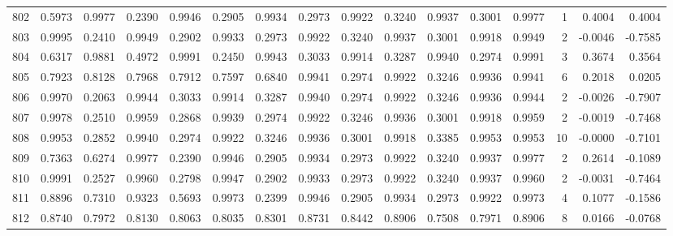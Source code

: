 \begin{tabular}{lrrrrrrrrrrrrrrr}
802 &      0.5973 &  0.9977 &  0.2390 &  0.9946 &  0.2905 &  0.9934 &  0.2973 &  0.9922 &  0.3240 &  0.9937 &   0.3001 &     0.9977 &      1 &                    0.4004 &                     0.4004 \\
803 &      0.9995 &  0.2410 &  0.9949 &  0.2902 &  0.9933 &  0.2973 &  0.9922 &  0.3240 &  0.9937 &  0.3001 &   0.9918 &     0.9949 &      2 &                   -0.0046 &                    -0.7585 \\
804 &      0.6317 &  0.9881 &  0.4972 &  0.9991 &  0.2450 &  0.9943 &  0.3033 &  0.9914 &  0.3287 &  0.9940 &   0.2974 &     0.9991 &      3 &                    0.3674 &                     0.3564 \\
805 &      0.7923 &  0.8128 &  0.7968 &  0.7912 &  0.7597 &  0.6840 &  0.9941 &  0.2974 &  0.9922 &  0.3246 &   0.9936 &     0.9941 &      6 &                    0.2018 &                     0.0205 \\
806 &      0.9970 &  0.2063 &  0.9944 &  0.3033 &  0.9914 &  0.3287 &  0.9940 &  0.2974 &  0.9922 &  0.3246 &   0.9936 &     0.9944 &      2 &                   -0.0026 &                    -0.7907 \\
807 &      0.9978 &  0.2510 &  0.9959 &  0.2868 &  0.9939 &  0.2974 &  0.9922 &  0.3246 &  0.9936 &  0.3001 &   0.9918 &     0.9959 &      2 &                   -0.0019 &                    -0.7468 \\
808 &      0.9953 &  0.2852 &  0.9940 &  0.2974 &  0.9922 &  0.3246 &  0.9936 &  0.3001 &  0.9918 &  0.3385 &   0.9953 &     0.9953 &     10 &                   -0.0000 &                    -0.7101 \\
809 &      0.7363 &  0.6274 &  0.9977 &  0.2390 &  0.9946 &  0.2905 &  0.9934 &  0.2973 &  0.9922 &  0.3240 &   0.9937 &     0.9977 &      2 &                    0.2614 &                    -0.1089 \\
810 &      0.9991 &  0.2527 &  0.9960 &  0.2798 &  0.9947 &  0.2902 &  0.9933 &  0.2973 &  0.9922 &  0.3240 &   0.9937 &     0.9960 &      2 &                   -0.0031 &                    -0.7464 \\
811 &      0.8896 &  0.7310 &  0.9323 &  0.5693 &  0.9973 &  0.2399 &  0.9946 &  0.2905 &  0.9934 &  0.2973 &   0.9922 &     0.9973 &      4 &                    0.1077 &                    -0.1586 \\
812 &      0.8740 &  0.7972 &  0.8130 &  0.8063 &  0.8035 &  0.8301 &  0.8731 &  0.8442 &  0.8906 &  0.7508 &   0.7971 &     0.8906 &      8 &                    0.0166 &                    -0.0768 \\

\end{tabular}
